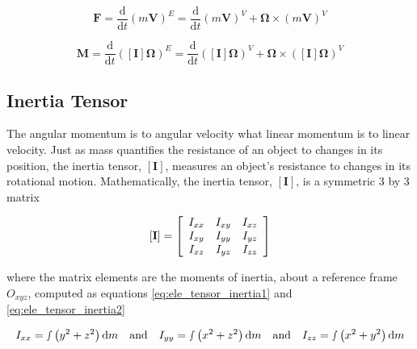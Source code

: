 \begin{equation}
    \mathbf{F} = \frac{\mathrm{d}}{\mathrm{d}t} \left( m \mathbf{V} \right)^E = \frac{\mathrm{d}}{\mathrm{d}t} \left( m \mathbf{V} \right)^V + \boldsymbol{\Omega} \times \left( m \mathbf{V} \right)^V
    \label{eq:force_equation}
\end{equation}


\begin{equation}
    \mathbf{M} = \frac{\mathrm{d}}{\mathrm{d}t} \left( \left[\mathbf{I}\right] \boldsymbol{\Omega} \right)^E = \frac{\mathrm{d}}{\mathrm{d}t} \left( \left[\mathbf{I}\right] \boldsymbol{\Omega} \right)^V + \boldsymbol{\Omega} \times \left( \left[\mathbf{I}\right] \boldsymbol{\Omega} \right)^V
    \label{eq:momentum_equation}
\end{equation}


\subsection{Inertia Tensor}


The angular momentum is to angular velocity what linear momentum is to linear velocity. Just as mass quantifies the resistance of an object to changes in its position, the inertia tensor, $\left[\mathbf{I}\right]$, measures an object's resistance to changes in its rotational motion. Mathematically, the inertia tensor, $\left[\mathbf{I}\right]$, is a symmetric 3 by 3 matrix 

\begin{equation}
    \left[\mathbf{I}\right]=\left[\begin{array}{c c c}{{I_{x x}}}&{{I_{x y}}}&{{I_{x z}}}\\ {{I_{x y}}}&{{I_{y y}}}&{{I_{y z}}}\\ {{I_{x z}}}&{{I_{y z}}}&{{I_{z z}}}\end{array}\right]
\end{equation}

where the matrix elements are the moments of inertia, about a reference frame $O_{xyz}$, computed as equations \ref{eq:ele_tensor_inertia1} and \ref{eq:ele_tensor_inertia2}

\begin{equation}
    I_{xx} = \smallint  \left( y^2 + z^2 \right) \mathrm{d}m \quad \text{and} \quad I_{yy} = \smallint  \left( x^2 + z^2 \right) \mathrm{d}m \quad \text{and} \quad I_{zz} = \smallint  \left( x^2 + y^2 \right) \mathrm{d}m
    \label{eq:ele_tensor_inertia1}
\end{equation}


